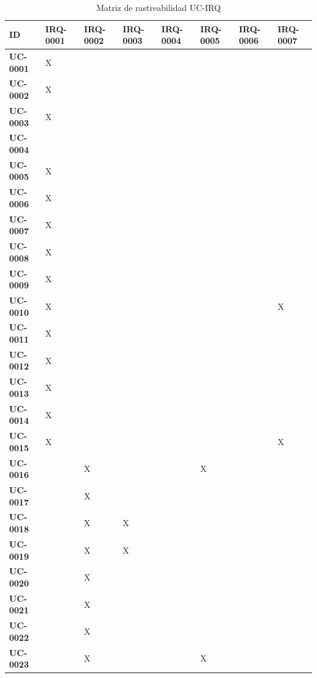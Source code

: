 \documentclass[11pt, a4paper]{article}
\begin{document}
{\setlength{\tabcolsep}{3pt}
\begin{center}
{\footnotesize
\begin{longtable}{|p{1.6cm}|p{1.55cm}|p{1.55cm}|p{1.55cm}|p{1.55cm}|p{1.55cm}|p{1.55cm}|p{1.55cm}|}
\caption{Matriz de rastreabilidad UC-IRQ} \label{tab:matriz-uc-irq} \\
\hline
\textbf{ID} & \textbf{IRQ-0001} & \textbf{IRQ-0002} & \textbf{IRQ-0003} & \textbf{IRQ-0004} & \textbf{IRQ-0005} & \textbf{IRQ-0006} & \textbf{IRQ-0007} \\
\hline
\hline
\endhead
\textbf{UC-0001} & X &  &  &  &  &  &  \\
\hline
\textbf{UC-0002} & X &  &  &  &  &  &  \\
\hline
\textbf{UC-0003} & X &  &  &  &  &  &  \\
\hline
\textbf{UC-0004} &  &  &  &  &  &  &  \\
\hline
\textbf{UC-0005} & X &  &  &  &  &  &  \\
\hline
\textbf{UC-0006} & X &  &  &  &  &  &  \\
\hline
\textbf{UC-0007} & X &  &  &  &  &  &  \\
\hline
\textbf{UC-0008} & X &  &  &  &  &  &  \\
\hline
\textbf{UC-0009} & X &  &  &  &  &  &  \\
\hline
\textbf{UC-0010} & X &  &  &  &  &  & X \\
\hline
\textbf{UC-0011} & X &  &  &  &  &  &  \\
\hline
\textbf{UC-0012} & X &  &  &  &  &  &  \\
\hline
\textbf{UC-0013} & X &  &  &  &  &  &  \\
\hline
\textbf{UC-0014} & X &  &  &  &  &  &  \\
\hline
\textbf{UC-0015} & X &  &  &  &  &  & X \\
\hline
\textbf{UC-0016} &  & X &  &  & X &  &  \\
\hline
\textbf{UC-0017} &  & X &  &  &  &  &  \\
\hline
\textbf{UC-0018} &  & X & X &  &  &  &  \\
\hline
\textbf{UC-0019} &  & X & X &  &  &  &  \\
\hline
\textbf{UC-0020} &  & X &  &  &  &  &  \\
\hline
\textbf{UC-0021} &  & X &  &  &  &  &  \\
\hline
\textbf{UC-0022} &  & X &  &  &  &  &  \\
\hline
\textbf{UC-0023} &  & X &  &  & X &  &  \\

\end{longtable}}
\end{center}}
\end{document}
